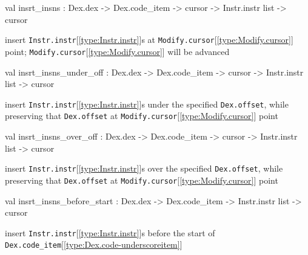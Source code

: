 \documentclass[11pt]{article}
\begin{document}
\label{val:Modify.insrt-underscoreinsns}\begin{ocamldoccode}
val insrt_insns :
  Dex.dex ->
  Dex.code_item -> cursor -> Instr.instr list -> cursor
\end{ocamldoccode}
\begin{ocamldocdescription}
insert {\tt{Instr.instr}}[\ref{type:Instr.instr}]s at {\tt{Modify.cursor}}[\ref{type:Modify.cursor}] point; {\tt{Modify.cursor}}[\ref{type:Modify.cursor}] will be advanced


\end{ocamldocdescription}




\label{val:Modify.insrt-underscoreinsns-underscoreunder-underscoreoff}\begin{ocamldoccode}
val insrt_insns_under_off :
  Dex.dex ->
  Dex.code_item -> cursor -> Instr.instr list -> cursor
\end{ocamldoccode}
\begin{ocamldocdescription}
insert {\tt{Instr.instr}}[\ref{type:Instr.instr}]s under the specified {\tt{Dex.offset}},
 while preserving that {\tt{Dex.offset}} at {\tt{Modify.cursor}}[\ref{type:Modify.cursor}] point


\end{ocamldocdescription}




\label{val:Modify.insrt-underscoreinsns-underscoreover-underscoreoff}\begin{ocamldoccode}
val insrt_insns_over_off :
  Dex.dex ->
  Dex.code_item -> cursor -> Instr.instr list -> cursor
\end{ocamldoccode}
\begin{ocamldocdescription}
insert {\tt{Instr.instr}}[\ref{type:Instr.instr}]s over the specified {\tt{Dex.offset}},
 while preserving that {\tt{Dex.offset}} at {\tt{Modify.cursor}}[\ref{type:Modify.cursor}] point


\end{ocamldocdescription}




\label{val:Modify.insrt-underscoreinsns-underscorebefore-underscorestart}\begin{ocamldoccode}
val insrt_insns_before_start :
  Dex.dex -> Dex.code_item -> Instr.instr list -> cursor
\end{ocamldoccode}
\begin{ocamldocdescription}
insert {\tt{Instr.instr}}[\ref{type:Instr.instr}]s before the start of {\tt{Dex.code\_item}}[\ref{type:Dex.code-underscoreitem}]


\end{ocamldocdescription}
\end{document}
